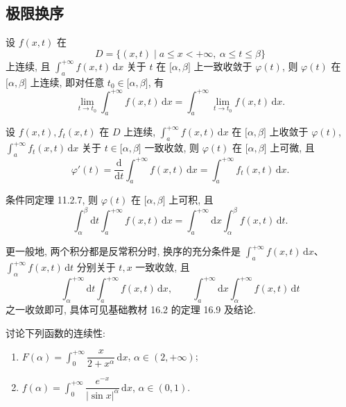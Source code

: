 \subsection{极限换序}

\begin{theorem}
    设 $f(x,t)$ 在
    \[
        D=\{(x,t)\mid a\leq x<+\infty,\ \alpha\leq t\leq\beta\}
    \]
    上连续, 且 $\displaystyle\int_a^{+\infty}f(x,t)\,\mathrm{d}x$ 关于 $t$ 在 $\lbrack\alpha,\beta\rbrack$ 上一致收敛于 $\varphi(t)$, 则 $\varphi(t)$ 在 $\lbrack\alpha,\beta\rbrack$ 上连续, 即对任意 $t_0\in\lbrack\alpha,\beta\rbrack$, 有
    \[
        \lim\limits_{t\to t_0}\int_a^{+\infty}f(x,t)\,\mathrm{d}x
        =\int_a^{+\infty}\lim\limits_{t\to t_0}f(x,t)\,\mathrm{d}x.
    \]
\end{theorem}

\begin{theorem}
    设 $f(x,t),f_t(x,t)$ 在 $D$ 上连续, $\displaystyle\int_a^{+\infty}f(x,t)\,\mathrm{d}x$ 在 $\lbrack\alpha,\beta\rbrack$ 上收敛于 $\varphi(t)$, $\displaystyle\int_a^{+\infty}f_t(x,t)\,\mathrm{d}x$ 关于 $t\in\lbrack\alpha,\beta\rbrack$ 一致收敛, 则 $\varphi(t)$ 在 $\lbrack\alpha,\beta\rbrack$ 上可微, 且
    \[
        \varphi'(t)=\dfrac{\mathrm{d}}{\mathrm{d}t}\int_a^{+\infty}f(x,t)\,\mathrm{d}x
        =\int_a^{+\infty}f_t(x,t)\,\mathrm{d}x.
    \]
\end{theorem}

\begin{theorem}
    条件同定理 11.2.7, 则 $\varphi(t)$ 在 $\lbrack\alpha,\beta\rbrack$ 上可积, 且
    \[
        \int_\alpha^\beta\mathrm{d}t\int_a^{+\infty}f(x,t)\,\mathrm{d}x
        =\int_a^{+\infty}\mathrm{d}x\int_\alpha^\beta f(x,t)\,\mathrm{d}t.
    \]
\end{theorem}

\begin{remark}
    更一般地, 两个积分都是反常积分时, 换序的充分条件是 $\displaystyle\int_a^{+\infty}f(x,t)\,\mathrm{d}x$、$\displaystyle\int_\alpha^{+\infty}f(x,t)\,\mathrm{d}t$ 分别关于 $t,x$ 一致收敛, 且
    \[
        \int_\alpha^{+\infty}\mathrm{d}t\int_a^{+\infty}f(x,t)\,\mathrm{d}x,
        \qquad
        \int_a^{+\infty}\mathrm{d}x\int_\alpha^{+\infty}f(x,t)\,\mathrm{d}t
    \]
    之一收敛即可, 具体可见基础教材 16.2 的定理 16.9 及结论.
\end{remark}

\begin{example}
    讨论下列函数的连续性:
    \begin{enumerate}
        \item $\displaystyle F(\alpha)=\int_0^{+\infty}\dfrac{x}{2+x^\alpha}\,\mathrm{d}x$, $\alpha\in(2,+\infty)$;
        \item $\displaystyle f(\alpha)=\int_0^{+\infty}\dfrac{e^{-x}}{|\sin x|^\alpha}\,\mathrm{d}x$, $\alpha\in(0,1)$.
    \end{enumerate}
\end{example}
\exampleblank

